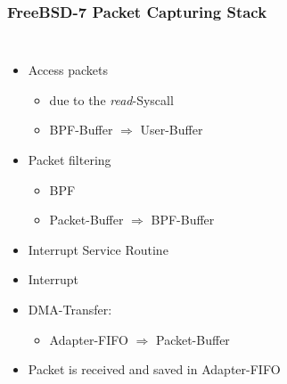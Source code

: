 \documentclass{beamer}
\begin{document}
\begin{frame}
\frametitle{FreeBSD-7 Packet Capturing Stack}
\begin{columns}
\vspace{0em}
\begin{itemize}
\item <7-> Access packets
	\begin{itemize}
		\item <7->due to the \emph{read}-Syscall
		\item <7->BPF-Buffer $\Rightarrow$ 	User-Buffer
	\end{itemize}
\item <5-> Packet filtering
	\begin{itemize}
		\item <5->BPF 
		\item <6->Packet-Buffer $\Rightarrow$ BPF-Buffer
	\end{itemize}
\item <4-> Interrupt Service Routine
\item <3-> Interrupt
\item <2-> DMA-Transfer:
	\begin{itemize}
		\item <2->Adapter-FIFO $\Rightarrow$ Packet-Buffer
	\end{itemize}
\item <1-> Packet is received and saved in Adapter-FIFO
\end{itemize}
\vspace{-2em}
\begin{figure}

\end{figure}
\end{columns}
\end{frame}
\end{document}
